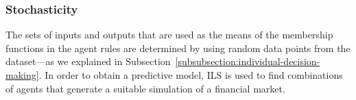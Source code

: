 \documentclass{ieeeaccess}
\begin{document}


\subsubsection{Stochasticity}
\label{subsubsection:stochasticity}



The sets of inputs and outputs that are used as the means of the membership functions in the agent rules are determined by using random data points from the dataset---as we explained in Subsection~\ref{subsubsection:individual-decision-making}. In order to obtain a predictive model, ILS is used to find combinations of agents that generate a suitable simulation of a financial market.
\end{document}
